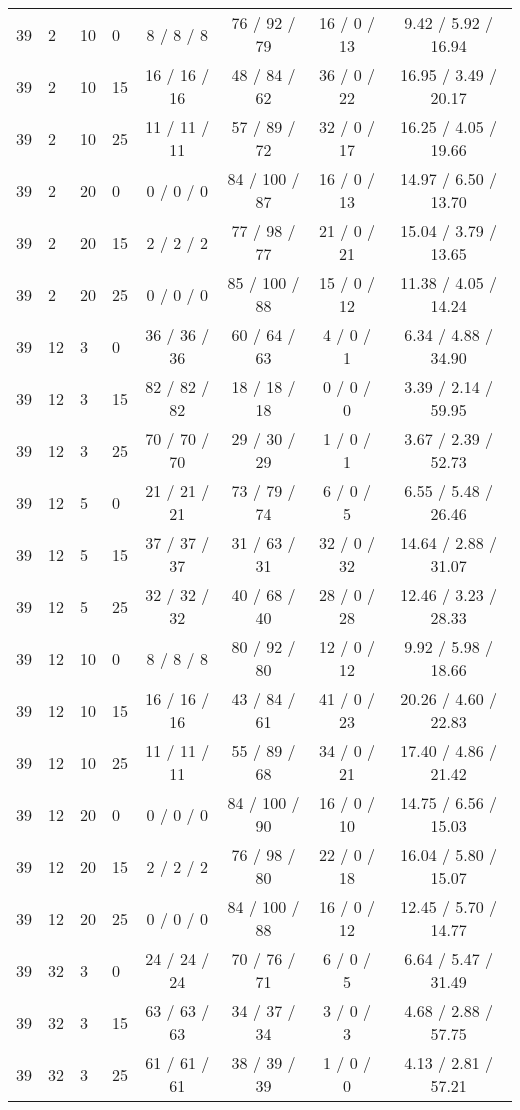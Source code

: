 \begin{table}[p]
\begin{tabular}{llllcccc}
39 & 2 & 10 & 0 & 8 / 8 / 8 & 76 / 92 / 79 & 16 / 0 / 13 & 9.42 / 5.92 / 16.94 \\
39 & 2 & 10 & 15 & 16 / 16 / 16 & 48 / 84 / 62 & 36 / 0 / 22 & 16.95 / 3.49 / 20.17 \\
39 & 2 & 10 & 25 & 11 / 11 / 11 & 57 / 89 / 72 & 32 / 0 / 17 & 16.25 / 4.05 / 19.66 \\
39 & 2 & 20 & 0 & 0 / 0 / 0 & 84 / 100 / 87 & 16 / 0 / 13 & 14.97 / 6.50 / 13.70 \\
39 & 2 & 20 & 15 & 2 / 2 / 2 & 77 / 98 / 77 & 21 / 0 / 21 & 15.04 / 3.79 / 13.65 \\
39 & 2 & 20 & 25 & 0 / 0 / 0 & 85 / 100 / 88 & 15 / 0 / 12 & 11.38 / 4.05 / 14.24 \\
39 & 12 & 3 & 0 & 36 / 36 / 36 & 60 / 64 / 63 & 4 / 0 / 1 & 6.34 / 4.88 / 34.90 \\
39 & 12 & 3 & 15 & 82 / 82 / 82 & 18 / 18 / 18 & 0 / 0 / 0 & 3.39 / 2.14 / 59.95 \\
39 & 12 & 3 & 25 & 70 / 70 / 70 & 29 / 30 / 29 & 1 / 0 / 1 & 3.67 / 2.39 / 52.73 \\
39 & 12 & 5 & 0 & 21 / 21 / 21 & 73 / 79 / 74 & 6 / 0 / 5 & 6.55 / 5.48 / 26.46 \\
39 & 12 & 5 & 15 & 37 / 37 / 37 & 31 / 63 / 31 & 32 / 0 / 32 & 14.64 / 2.88 / 31.07 \\
39 & 12 & 5 & 25 & 32 / 32 / 32 & 40 / 68 / 40 & 28 / 0 / 28 & 12.46 / 3.23 / 28.33 \\
39 & 12 & 10 & 0 & 8 / 8 / 8 & 80 / 92 / 80 & 12 / 0 / 12 & 9.92 / 5.98 / 18.66 \\
39 & 12 & 10 & 15 & 16 / 16 / 16 & 43 / 84 / 61 & 41 / 0 / 23 & 20.26 / 4.60 / 22.83 \\
39 & 12 & 10 & 25 & 11 / 11 / 11 & 55 / 89 / 68 & 34 / 0 / 21 & 17.40 / 4.86 / 21.42 \\
39 & 12 & 20 & 0 & 0 / 0 / 0 & 84 / 100 / 90 & 16 / 0 / 10 & 14.75 / 6.56 / 15.03 \\
39 & 12 & 20 & 15 & 2 / 2 / 2 & 76 / 98 / 80 & 22 / 0 / 18 & 16.04 / 5.80 / 15.07 \\
39 & 12 & 20 & 25 & 0 / 0 / 0 & 84 / 100 / 88 & 16 / 0 / 12 & 12.45 / 5.70 / 14.77 \\
39 & 32 & 3 & 0 & 24 / 24 / 24 & 70 / 76 / 71 & 6 / 0 / 5 & 6.64 / 5.47 / 31.49 \\
39 & 32 & 3 & 15 & 63 / 63 / 63 & 34 / 37 / 34 & 3 / 0 / 3 & 4.68 / 2.88 / 57.75 \\
39 & 32 & 3 & 25 & 61 / 61 / 61 & 38 / 39 / 39 & 1 / 0 / 0 & 4.13 / 2.81 / 57.21 \\

\end{tabular}
\end{table}

